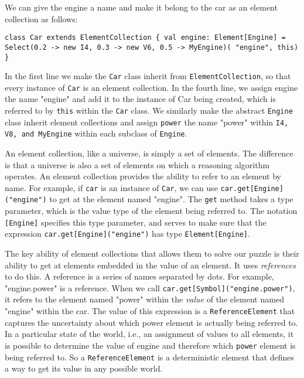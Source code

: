 We can give the engine a name and make it belong to the car as an element collection as follows:

\begin{flushleft}
\texttt{class Car extends ElementCollection \{
\newline \tab val engine: Element[Engine] =
\newline \tab Select(0.2 -> new I4, 0.3 -> new V6, 0.5 -> MyEngine)( "engine", this)
\newline \}
}
\end{flushleft}

In the first line we make the \texttt{Car} class inherit from \texttt{ElementCollect\-ion}, so that every instance of \texttt{Car} is an element collection. In the fourth line, we assign engine the name "engine" and add it to the instance of Car being created, which is referred to by \texttt{this} within the \texttt{Car} class. We similarly make the abstract \texttt{Engine} class inherit  element collections and assign \texttt{power} the name "power" within \texttt{I4, V8, and MyEngine} within each subclass of  \texttt{Engine}.

An element collection, like a universe, is simply a set of elements. The difference is that a universe is also a set of elements on which a reasoning algorithm operates. An element collection provides the ability to refer to an element by name. For example, if \texttt{car} is an instance of \texttt{Car}, we can use \texttt{car.get[Engine]("engine")} to get at the element named "engine". The \texttt{get} method takes a type parameter, which is the value type of the element being referred to. The notation \texttt{[Engine]} specifies this type parameter, and serves to make sure that the expression \texttt{car.get[Engine]("engine")} has type \texttt{Element[Engine]}.

The key ability of element collections that allows them to solve our puzzle is their ability to get at elements embedded in the value of an element.  It uses \emph{references} to do this. A reference is a series of names separated by dots. For example, "engine.power" is a reference. When we call \texttt{car.get[Symbol]("engine.power")}, it refers to the element named "power" within the \emph{value} of the element named "engine" within the car. The value of this expression is a \texttt{ReferenceElement} that captures the uncertainty about which power element is actually being referred to. In a particular state of the world, i.e., an assignment of values to all elements, it is possible to determine the value of engine and therefore which \texttt{power} element is being referred to. So a \texttt{ReferenceElement} is a deterministic element that defines a way to get its value in any possible world.

